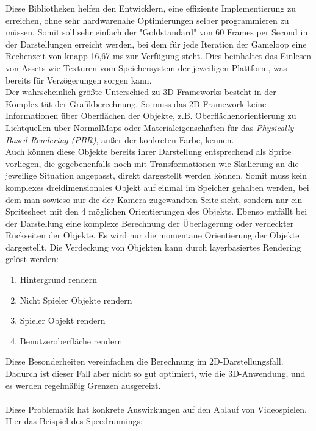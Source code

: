Diese Bibliotheken helfen den Entwicklern, eine effiziente Implementierung zu erreichen, ohne sehr hardwarenahe Optimierungen selber programmieren zu müssen. Somit soll sehr einfach der "Goldstandard" von 60 Frames per Second in der Darstellungen erreicht werden, bei dem für jede Iteration der Gameloop eine Rechenzeit von knapp 16,67 ms zur Verfügung steht. Dies beinhaltet das Einlesen von Assets wie Texturen vom Speichersystem der jeweiligen Plattform, was bereits für Verzögerungen sorgen kann.\\ 
Der wahrscheinlich größte Unterschied zu 3D-Frameworks besteht in der Komplexität der Grafikberechnung. So muss das 2D-Framework keine Informationen über Oberflächen der Objekte, z.B. Oberflächenorientierung zu Lichtquellen über NormalMaps oder Materialeigenschaften für das \emph{Physically Based Rendering (PBR)}, außer der konkreten Farbe, kennen.\\
Auch können diese Objekte bereits ihrer Darstellung entsprechend als Sprite vorliegen, die gegebenenfalls noch mit Transformationen wie Skalierung an die jeweilige Situation  angepasst, direkt dargestellt werden können. Somit muss kein komplexes dreidimensionales Objekt auf einmal im Speicher gehalten werden, bei dem man sowieso nur die der Kamera zugewandten Seite sieht, sondern nur ein Spritesheet mit den 4 möglichen Orientierungen des Objekts.
Ebenso entfällt bei der Darstellung eine komplexe Berechnung der Überlagerung oder verdeckter Rückseiten der Objekte. Es wird nur die momentane Orientierung der Objekte dargestellt. Die Verdeckung von Objekten kann durch layerbasiertes Rendering gelöst werden:
\begin{enumerate}
\item Hintergrund rendern\\
\item Nicht Spieler Objekte rendern\\
\item Spieler Objekt rendern\\
\item Benutzeroberfläche rendern\\
\end{enumerate}
Diese Besonderheiten vereinfachen die Berechnung im 2D-Darstellungsfall. Dadurch ist dieser Fall aber nicht so gut optimiert, wie die 3D-Anwendung, und es werden regelmäßig Grenzen ausgereizt.\\
\\
Diese Problematik hat konkrete Auswirkungen auf den Ablauf von Videospielen. Hier das Beispiel des Speedrunnings:

